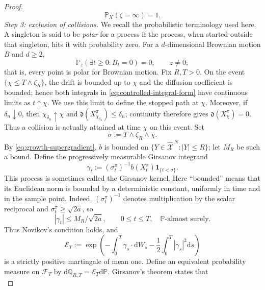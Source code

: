 \documentclass[11pt]{article}
\def\P{\mathbb{P}}
\def\Q{\mathbb{Q}}
\def\Fc{{\mathcal F}}
\def\Xc{{\mathcal X}}
\def\id{\mathbf{1}}
\def\hX{\widehat{\Xc}^{\,N}}
\newcommand{\dd}{\mathrm{d}}
\theoremstyle{definition}
\theoremstyle{remark}
\numberwithin{equation}{section}
\begin{document}
\begin{proof}
\begin{equation}\label{eq:no-explosion-control-detailed}
 \P_X(\zeta=\infty)=1.
\end{equation}
\medskip
\noindent\textit{Step 3: exclusion of collisions.}
We recall the probabilistic terminology used here.  A singleton is said to be \emph{polar} for a
process if the process, when started outside that singleton, hits it with probability zero.  For a
$d$-dimensional Brownian motion $B$ and $d\ge2$,
\begin{equation}\label{eq:Brownian-point-polar-control}
 \P_z(\exists t\ge0:B_t=0)=0,
 \qquad z\ne0;
\end{equation}
that is, every point is polar for Brownian motion.
Fix $R,T>0$.  On the event $\{\chi\le T\wedge\zeta_R\}$, the drift is bounded up to
$\chi$ and the diffusion coefficient is bounded; hence both integrals in
\eqref{eq:controlled-integral-form} have continuous limits as $t\uparrow\chi$.  We use this
limit to define the stopped path at $\chi$.  Moreover, if $\delta_n\downarrow0$, then
$\chi_{\delta_n}\uparrow\chi$ and
$\mathfrak d(X_{\chi_{\delta_n}}^\pi)\le\delta_n$; continuity therefore gives
$\mathfrak d(X_\chi^\pi)=0$.  Thus a collision is actually attained at time $\chi$ on this
event.  Set
\[
 \sigma:=T\wedge\zeta_R\wedge\chi.
\]
By \eqref{eq:growth-supergradient}, $b$ is bounded on
$\{Y\in\hX:|Y|\le R\}$; let $M_R$ be such a bound.  Define the progressively measurable Girsanov
integrand
\begin{equation}\label{eq:Girsanov-integrand-control}
 \gamma_t:=(\sigma_t^\pi)^{-1}b(X_t^\pi)\id_{\{t<\sigma\}}.
\end{equation}
This process is sometimes called the Girsanov kernel.  Here ``bounded'' means that its Euclidean
norm is bounded by a deterministic constant, uniformly in time and in the sample point.  Indeed,
$(\sigma_t^\pi)^{-1}$ denotes multiplication by the scalar reciprocal and
$\sigma_t^\pi\ge\sqrt{2a}$, so
\[
 |\gamma_t|\le M_R/\sqrt{2a},
 \qquad0\le t\le T,
 \quad\P\text{-almost surely}.
\]
Thus Novikov's condition holds, and
\begin{equation}\label{eq:Girsanov-density-control}
 \mathcal E_T
 :=\exp\left(-\int_0^T\gamma_s\cdot\dd W_s
 -\frac12\int_0^T|\gamma_s|^2\dd s\right)
\end{equation}
is a strictly positive martingale of mean one.  Define an equivalent probability measure on
$\Fc_T$ by $\dd\Q_{R,T}=\mathcal E_T\dd\P$.  Girsanov's theorem states that
\begin{equation}\label{eq:Girsanov-Brownian-control}

\end{equation}
\end{proof}
\end{document}
